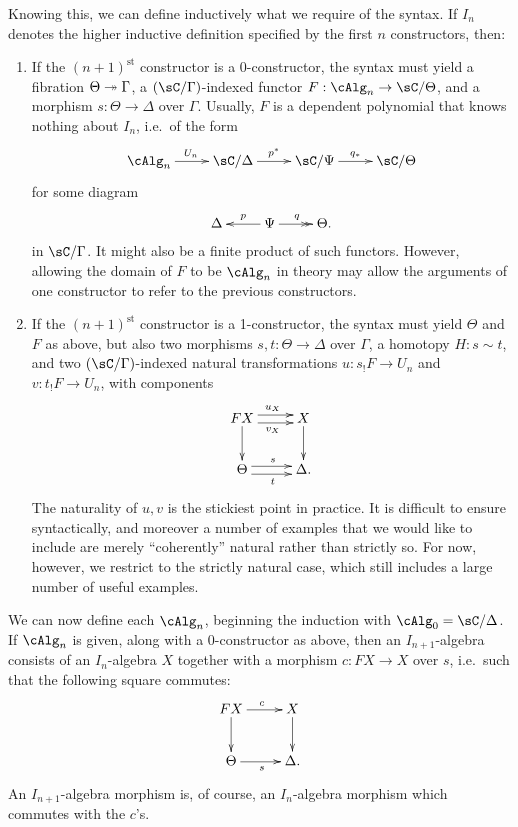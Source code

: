 \documentclass{amsart}
\begin{document}
Knowing this, we can define inductively what we require of the syntax.
If $I_n$ denotes the higher inductive definition specified by the first $n$ constructors, then:
\begin{enumerate}
\item If the $(n+1)^{\mathrm{st}}$ constructor is a 0-constructor, the syntax must yield a fibration $\Theta\twoheadrightarrow \Gamma$, a $(\sC/\Gamma)$-indexed functor $F:\cAlg_{n} \to \sC/\Theta$, and a morphism $s:\Theta \to \Delta$ over $\Gamma$.
  Usually, $F$ is a dependent polynomial that knows nothing about $I_n$, i.e.\ of the form
  \begin{equation}\label{eq:deppoly}
    \vcenter{\xymatrix{
        \cAlg_{n} \ar[r]^{U_{n}} &
        \sC/\Delta\ar[r]^{p^*} &
        \sC/\Psi\ar[r]^{q_*} &
        \sC/\Theta
      }}
  \end{equation}
  for some diagram
  \begin{equation}
    \vcenter{\xymatrix{
      \Delta\ar@{<-}[r]^p &
      \Psi\ar@{->>}[r]^q &
      \Theta.
      }}
  \end{equation}
  in $\sC/\Gamma$.
  It might also be a finite product of such functors.
  However, allowing the domain of $F$ to be $\cAlg_n$ in theory may allow the arguments of one constructor to refer to the previous constructors.
\item If the $(n+1)^{\mathrm{st}}$ constructor is a 1-constructor, the syntax must yield $\Theta$ and $F$ as above, but also two morphisms $s,t:\Theta\to\Delta$ over $\Gamma$, a homotopy $H:s\sim t$, and two $(\sC/\Gamma)$-indexed natural transformations $u:s_! F\to U_{n}$ and $v:t_! F \to U_{n}$, with components
  \begin{equation}
    \vcenter{\xymatrix{
        F X\ar@<1mm>[r]^{u_X} \ar@<-1mm>[r]_{v_X} \ar[d] &
        X\ar[d]\\
        \Theta \ar@<1mm>[r]^{s} \ar@<-1mm>[r]_t &
        \Delta.
      }}
  \end{equation}
  The naturality of $u,v$ is the stickiest point in practice.
  It is difficult to ensure syntactically, and moreover a number of examples that we would like to include are merely ``coherently'' natural rather than strictly so.
  For now, however, we restrict to the strictly natural case, which still includes a large number of useful examples.
\end{enumerate}

We can now define each $\cAlg_{{n}}$, beginning the induction with $\cAlg_{0} = \sC/\Delta$.
If $\cAlg_{{n}}$ is given, along with a 0-constructor as above, then an $I_{n+1}$-algebra consists of an $I_n$-algebra $X$ together with a morphism $c:FX \to X$ over $s$, i.e.\ such that the following square commutes:
\begin{equation}\label{eq:0constr-alg}
  \vcenter{\xymatrix{
      F X\ar[r]^{c} \ar[d] &
      X\ar[d]\\
      \Theta\ar[r]_s &
      \Delta.
    }}
\end{equation}
An $I_{n+1}$-algebra morphism is, of course, an $I_n$-algebra morphism which commutes with the $c$'s.
\end{document}
